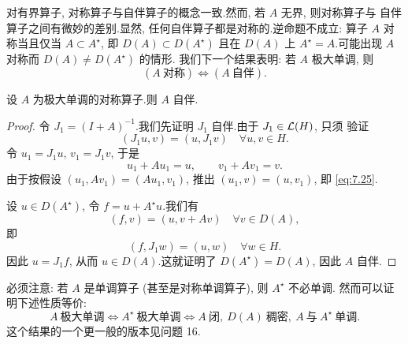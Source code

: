 \begin{remark}
\label{rem:7.7}
对有界算子, 对称算子与自伴算子的概念一致.然而, 若 $A$ 无界, 则对称算子与
自伴算子之间有微妙的差别.显然, 任何自伴算子都是对称的.逆命题不成立: 算子
$A$ 对称当且仅当 $A\subset A^\star$, 即 $D(A)\subset D(A^\star)$ 且在
$D(A)$ 上 $A^\star=A$.可能出现 $A$ 对称而 $D(A)\ne D(A^\star)$ 的情形.
我们下一个结果表明: 若 $A$ 极大单调, 则
\begin{equation*}
(A\ \text{对称})\iff(A\ \text{自伴}).
\end{equation*}
\end{remark}

\begin{proposition}
\label{prop:7.6}
设 $A$ 为极大单调的对称算子.则 $A$ 自伴.
\end{proposition}

\begin{proof}
令 $J_1=(I+A)^{-1}$.我们先证明 $J_1$ 自伴.由于 $J_1\in\mathcal{L}(H)$, 只须
验证
\begin{equation}
(J_1u,v)=(u,J_1v)\quad\forall u,v\in H.
\label{eq:7.25}
\end{equation}
令 $u_1=J_1u$, $v_1=J_1v$, 于是
\begin{equation*}
u_1+Au_1=u,\qquad v_1+Av_1=v.
\end{equation*}
由于按假设 $(u_1,Av_1)=(Au_1,v_1)$, 推出 $(u_1,v)=(u,v_1)$, 即
\eqref{eq:7.25}.

设 $u\in D(A^\star)$, 令 $f=u+A^\star u$.我们有
\begin{equation*}
(f,v)=(u,v+Av)\quad\forall v\in D(A),
\end{equation*}
即
\begin{equation*}
(f,J_1w)=(u,w)\quad\forall w\in H.
\end{equation*}
因此 $u=J_1f$, 从而 $u\in D(A)$.这就证明了 $D(A^\star)=D(A)$, 因此 $A$
自伴.
\end{proof}

\begin{remark}
\label{rem:7.8}
必须注意: 若 $A$ 是单调算子 (甚至是对称单调算子), 则 $A^\star$ 不必单调.
然而可以证明下述性质等价:
\begin{equation*}
A\ \text{极大单调}\iff A^\star\ \text{极大单调}
\iff A\ \text{闭},\ D(A)\ \text{稠密},\ A\ \text{与}\ A^\star\
\text{单调}.
\end{equation*}
这个结果的一个更一般的版本见问题 16.
\end{remark}

